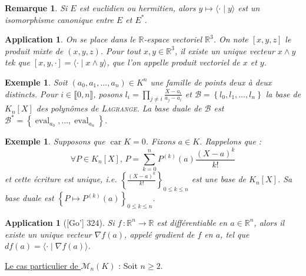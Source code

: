 \documentclass[10pt, a4paper, parskip=full, twoside, twocolumn]{report}
\newtheorem{example}[definition]{Exemple}
\newtheorem{remark}[definition]{Remarque}
\newtheorem{application}[definition]{Application}
\newcommand{\IR}{\mathbb{R}}
\newcommand{\M}{\mathcal{M}}
\newcommand{\B}{\mathcal{B}}
\DeclareMathOperator{\car}{car}
\DeclareMathOperator{\eval}{eval}
\begin{document}
\begin{remark}
	Si $E$ est euclidien ou hermitien, alors $y\mapsto \langle\cdot\mid y\rangle$ est un isomorphisme canonique entre $E$ et $E^*$.
\end{remark}

\begin{application}
	On se place dans le $\IR$-espace vectoriel $\IR^3$.
	On note $[x,y,z]$ le produit mixte de $(x,y,z)$. Pour tout $x,y\in\IR^3$, il existe un unique vecteur $x\wedge y$ tek que $[x,y,\cdot] = \langle\cdot\mid x\wedge y\rangle$,
	que l'on appelle \emph{produit vectoriel de $x$ et $y$}.
\end{application}

\begin{example}
	Soit $(a_0,a_1,\dots,a_n)\in K^n$ une famille de points deux à deux distincts.
	Pour $i\in \llbracket 0,n\rrbracket$, posons $l_i = \prod_{j\neq i}\frac{X-a_i}{a_j-a_i}$
	et $\B=\left\{l_0,l_1,\dots, l_n\right\}$ la base de $K_n[X]$ des polynômes de \textsc{Lagrange}.
	La base duale de $\B$ est $\B^*=\left\{\eval_{a_0},\dots, \eval_{a_n}\right\}$.
\end{example}

\begin{example}Supposons que $\car K = 0$.
	Fixons $a\in K$. Rappelons que :
	$$\forall P\in K_n[X],\, P=\sum_{k=0}^{n}P^{(k)}(a)\frac{(X-a)^k}{k!}$$
	et cette écriture est unique, \emph{i.e.} $\left\{\frac{(X-a)^k}{k!}\right\}_{0\leq k\leq n}$ est une base de $K_n[X]$.
	Sa base duale est $\left\{P\mapsto P^{(k)}(a)\right\}_{0\leq k \leq n}$.
\end{example}

\begin{application}[\textnormal{[Go'] 324}]
	Si $f\,\colon \IR^n\to \IR$ est différentiable en $a\in\IR^n$, alors il existe un unique vecteur $\nabla f(a)$, appelé \emph{gradient de $f$ en $a$}, tel que $df(a)=\langle \cdot\mid \nabla f(a)\rangle$.
\end{application}

\textcolor{paragraphtext}{\underline{Le cas particulier de $\M_n(K)$} :} Soit $n\geq 2$.
\end{document}
